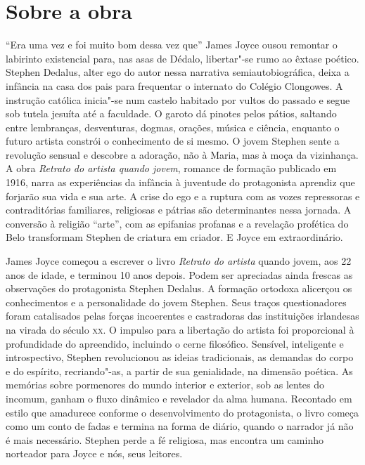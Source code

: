 \section{Sobre a obra}

``Era uma vez e foi muito bom dessa vez que'' James Joyce ousou remontar
o labirinto existencial para, nas asas de Dédalo, libertar"-se rumo ao
êxtase poético. Stephen Dedalus, alter ego do autor nessa narrativa
semiautobiográfica, deixa a infância na casa dos pais para frequentar o
internato do Colégio Clongowes. A instrução católica inicia"-se num
castelo habitado por vultos do passado e segue sob tutela jesuíta até a
faculdade. O garoto dá pinotes pelos pátios, saltando entre lembranças,
desventuras, dogmas, orações, música e ciência, enquanto o futuro
artista constrói o conhecimento de si mesmo. O jovem Stephen sente a
revolução sensual e descobre a adoração, não à Maria, mas à moça da
vizinhança. A obra \textit{Retrato do artista quando jovem}, romance de
formação publicado em 1916, narra as experiências da infância à
juventude do protagonista aprendiz que forjarão sua vida e sua arte. A
crise do ego e a ruptura com as vozes repressoras e contraditórias
familiares, religiosas e pátrias são determinantes nessa jornada. A
conversão à religião ``arte'', com as epifanias profanas e a revelação
profética do Belo transformam Stephen de criatura em criador. E Joyce em
extraordinário.

James Joyce começou a escrever o livro \textit{Retrato do artista} quando jovem,
aos 22 anos de idade, e terminou 10 anos depois. Podem ser apreciadas
ainda frescas as observações do protagonista Stephen Dedalus. A formação
ortodoxa alicerçou os conhecimentos e a personalidade do jovem Stephen.
Seus traços questionadores foram catalisados pelas forças incoerentes e
castradoras das instituições irlandesas na virada do século \textsc{xx}. O
impulso para a libertação do artista foi proporcional à profundidade do
apreendido, incluindo o cerne filosófico. Sensível, inteligente e
introspectivo, Stephen revolucionou as ideias tradicionais, as demandas
do corpo e do espírito, recriando"-as, a partir de sua genialidade, na
dimensão poética. As memórias sobre pormenores do mundo interior e
exterior, sob as lentes do incomum, ganham o fluxo dinâmico e revelador
da alma humana. Recontado em estilo que amadurece conforme o
desenvolvimento do protagonista, o livro começa como um conto de fadas e
termina na forma de diário, quando o narrador já não é mais necessário.
Stephen perde a fé religiosa, mas encontra um caminho norteador para
Joyce e nós, seus leitores.

